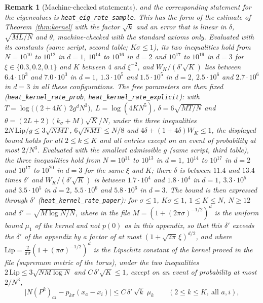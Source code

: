 \documentclass[11pt,a4paper]{article}
\theoremstyle{stmt}
\theoremstyle{defn}
\theoremstyle{rmk}
\newtheorem{remark}[theorem]{Remark}
\numberwithin{equation}{section}
\begin{document}
{\begin{remark}[Machine-checked statements]
and the corresponding statement for the eigenvalues is \texttt{heat\_eig\_rate\_sample}. This has the form of the estimate of Theorem~\ref{thm:kernel} with the factor $\sqrt k$ and an error that is linear in $\delta$, $\sqrt{ML/N}$ and $\theta$, machine-checked with the standard axioms only. Evaluated with its constants (same script, second table; $K\sigma\le1$), its two inequalities hold from $N=10^{10}$ to $10^{12}$ in $d=1$, $10^{14}$ to $10^{16}$ in $d=2$ and $10^{17}$ to $10^{19}$ in $d=3$ for $\xi\in\{0.3,0.2,0.1\}$ and $K$ between $4$ and $\xi^{-2}$, and $W_K/(\delta'\sqrt K)$ lies between $6.4\cdot10^{3}$ and $7.0\cdot10^{3}$ in $d=1$, $1.3\cdot10^{5}$ and $1.5\cdot10^{5}$ in $d=2$, $2.5\cdot10^{6}$ and $2.7\cdot10^{6}$ in $d=3$ in all these configurations. The free parameters are then fixed (\texttt{heat\_kernel\_rate\_prob}, \texttt{heat\_kernel\_rate\_explicit}): with $T=\log\big((2+4K)\,2g^dN^3\big)$, $L=\log(4KN^5)$, $\delta=6\sqrt{MT/N}$ and $\theta=(2L+2)(k_\sigma+M)\sqrt K/N$, under the three inequalities $2N\,\mathrm{Lip}/g\le3\sqrt{NMT}$, $6\sqrt{NMT}\le N/8$ and $4\delta+(1+4\delta)W_K\le1$, the displayed bound holds for all $2\le k\le K$ and all entries except on an event of probability at most $2/N^3$. Evaluated with the smallest admissible $g$ (same script, third table), the three inequalities hold from $N=10^{11}$ to $10^{13}$ in $d=1$, $10^{14}$ to $10^{17}$ in $d=2$ and $10^{17}$ to $10^{20}$ in $d=3$ for the same $\xi$ and $K$; there $\delta$ is between $11.4$ and $13.4$ times $\delta'$ and $W_K/(\delta'\sqrt K)$ is between $1.7\cdot10^{4}$ and $1.8\cdot10^{4}$ in $d=1$, $3.3\cdot10^{5}$ and $3.5\cdot10^{5}$ in $d=2$, $5.5\cdot10^{6}$ and $5.8\cdot10^{6}$ in $d=3$. The bound is then expressed through $\delta'$ (\texttt{heat\_kernel\_rate\_paper}): for $\sigma\le1$, $K\sigma\le1$, $1\le K\le N$, $N\ge12$ and $\delta'=\sqrt{M\log N/N}$, where in the file $M=(1+(2\pi\sigma)^{-1/2})^d$ is the uniform bound $\mu_1$ of the kernel and not $p(0)$ as in this appendix, so that this $\delta'$ exceeds the $\delta'$ of the appendix by a factor of at most $(1+\sqrt{2\pi}\,\xi)^{d/2}$, and where $\mathrm{Lip}=\frac{2}{\pi\sigma}(1+(\pi\sigma)^{-1/2})^d$ is the Lipschitz constant of the kernel proved in the file (supremum metric of the torus), under the two inequalities $2\,\mathrm{Lip}\le3\sqrt{NM\log N}$ and $C\,\delta'\sqrt K\le1$, except on an event of probability at most $2/N^3$,
\[
\big|N(P^{k})_{ai}-p_{k\sigma}(x_a-x_i)\big|\le C\,\delta'\,\sqrt k\;\mu_k\qquad(2\le k\le K,\ \text{all }a,i),
\]

\end{remark}}
\end{document}
